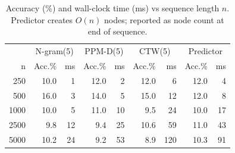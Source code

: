 \begin{table}[h]
\centering
\caption{Accuracy (\%) and wall-clock time (ms) vs sequence length $n$. Predictor creates $O(n)$ nodes; reported as node count at end of sequence.}
\label{tab:scaling}
\begin{tabular}{rrrrrrrrr}
\toprule
 & \multicolumn{2}{c}{N-gram(5)} & \multicolumn{2}{c}{PPM-D(5)} & \multicolumn{2}{c}{CTW(5)} & \multicolumn{2}{c}{Predictor} \\
n & Acc.\% & ms & Acc.\% & ms & Acc.\% & ms & Acc.\% & ms \\
\midrule
250 & 10.0 & 1 & 12.0 & 2 & 12.0 & 6 & 12.0 & 4 \\
500 & 16.0 & 3 & 14.0 & 5 & 15.0 & 12 & 12.0 & 8 \\
1000 & 10.0 & 5 & 11.0 & 10 & 9.5 & 24 & 10.0 & 17 \\
2500 & 9.8 & 12 & 9.4 & 25 & 10.6 & 59 & 11.0 & 43 \\
5000 & 10.2 & 24 & 9.2 & 53 & 8.9 & 120 & 10.3 & 91 \\
\bottomrule
\end{tabular}
\end{table}
